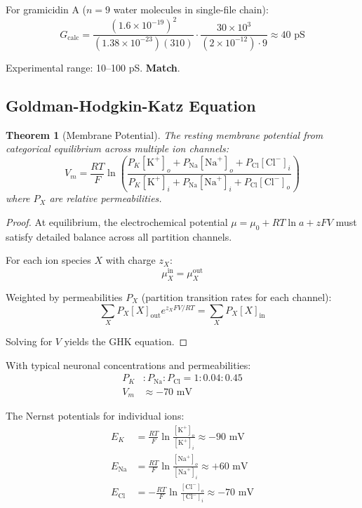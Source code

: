 \documentclass[twocolumn,10pt]{article}
\newtheorem{theorem}{Theorem}[section]
\theoremstyle{definition}
\theoremstyle{remark}
\begin{document}
For gramicidin A ($n = 9$ water molecules in single-file chain):
\begin{equation}
G_{\text{calc}} = \frac{(1.6 \times 10^{-19})^2}{(1.38 \times 10^{-23})(310)} \cdot \frac{30 \times 10^3}{(2 \times 10^{-12}) \cdot 9} \approx 40 \text{ pS}
\end{equation}

Experimental range: 10--100 pS. \textbf{Match}.

\subsection{Goldman-Hodgkin-Katz Equation}

\begin{theorem}[Membrane Potential]
\label{thm:ghk}
The resting membrane potential from categorical equilibrium across multiple ion channels:
\begin{equation}
\boxed{V_m = \frac{RT}{F} \ln\left(\frac{P_K[\text{K}^+]_o + P_{\text{Na}}[\text{Na}^+]_o + P_{\text{Cl}}[\text{Cl}^-]_i}{P_K[\text{K}^+]_i + P_{\text{Na}}[\text{Na}^+]_i + P_{\text{Cl}}[\text{Cl}^-]_o}\right)}
\end{equation}
where $P_X$ are relative permeabilities.
\end{theorem}

\begin{proof}
At equilibrium, the electrochemical potential $\mu = \mu_0 + RT\ln a + zFV$ must satisfy detailed balance across all partition channels.

For each ion species $X$ with charge $z_X$:
\begin{equation}
\mu_X^{\text{in}} = \mu_X^{\text{out}}
\end{equation}

Weighted by permeabilities $P_X$ (partition transition rates for each channel):
\begin{equation}
\sum_X P_X [X]_{\text{out}} e^{z_X FV/RT} = \sum_X P_X [X]_{\text{in}}
\end{equation}

Solving for $V$ yields the GHK equation.
\end{proof}

With typical neuronal concentrations and permeabilities:
\begin{align}
P_K &: P_{\text{Na}} : P_{\text{Cl}} = 1 : 0.04 : 0.45 \\
V_m &\approx -70 \text{ mV}
\end{align}

The Nernst potentials for individual ions:
\begin{align}
E_K &= \frac{RT}{F}\ln\frac{[\text{K}^+]_o}{[\text{K}^+]_i} \approx -90 \text{ mV} \\
E_{\text{Na}} &= \frac{RT}{F}\ln\frac{[\text{Na}^+]_o}{[\text{Na}^+]_i} \approx +60 \text{ mV} \\
E_{\text{Cl}} &= -\frac{RT}{F}\ln\frac{[\text{Cl}^-]_o}{[\text{Cl}^-]_i} \approx -70 \text{ mV}
\end{align}
\end{document}
